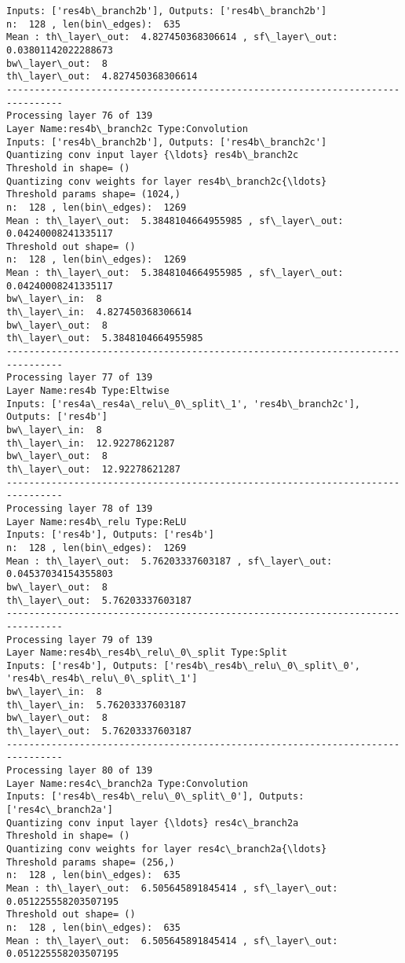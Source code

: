 \documentclass[11pt]{article}
\begin{document}
\begin{Verbatim}[commandchars=\\\{\}]
Inputs: ['res4b\_branch2b'], Outputs: ['res4b\_branch2b']
n:  128 , len(bin\_edges):  635
Mean : th\_layer\_out:  4.827450368306614 , sf\_layer\_out:  0.03801142022288673
bw\_layer\_out:  8
th\_layer\_out:  4.827450368306614
--------------------------------------------------------------------------------
Processing layer 76 of 139
Layer Name:res4b\_branch2c Type:Convolution
Inputs: ['res4b\_branch2b'], Outputs: ['res4b\_branch2c']
Quantizing conv input layer {\ldots} res4b\_branch2c
Threshold in shape= ()
Quantizing conv weights for layer res4b\_branch2c{\ldots}
Threshold params shape= (1024,)
n:  128 , len(bin\_edges):  1269
Mean : th\_layer\_out:  5.3848104664955985 , sf\_layer\_out:  0.04240008241335117
Threshold out shape= ()
n:  128 , len(bin\_edges):  1269
Mean : th\_layer\_out:  5.3848104664955985 , sf\_layer\_out:  0.04240008241335117
bw\_layer\_in:  8
th\_layer\_in:  4.827450368306614
bw\_layer\_out:  8
th\_layer\_out:  5.3848104664955985
--------------------------------------------------------------------------------
Processing layer 77 of 139
Layer Name:res4b Type:Eltwise
Inputs: ['res4a\_res4a\_relu\_0\_split\_1', 'res4b\_branch2c'], Outputs: ['res4b']
bw\_layer\_in:  8
th\_layer\_in:  12.92278621287
bw\_layer\_out:  8
th\_layer\_out:  12.92278621287
--------------------------------------------------------------------------------
Processing layer 78 of 139
Layer Name:res4b\_relu Type:ReLU
Inputs: ['res4b'], Outputs: ['res4b']
n:  128 , len(bin\_edges):  1269
Mean : th\_layer\_out:  5.76203337603187 , sf\_layer\_out:  0.04537034154355803
bw\_layer\_out:  8
th\_layer\_out:  5.76203337603187
--------------------------------------------------------------------------------
Processing layer 79 of 139
Layer Name:res4b\_res4b\_relu\_0\_split Type:Split
Inputs: ['res4b'], Outputs: ['res4b\_res4b\_relu\_0\_split\_0', 'res4b\_res4b\_relu\_0\_split\_1']
bw\_layer\_in:  8
th\_layer\_in:  5.76203337603187
bw\_layer\_out:  8
th\_layer\_out:  5.76203337603187
--------------------------------------------------------------------------------
Processing layer 80 of 139
Layer Name:res4c\_branch2a Type:Convolution
Inputs: ['res4b\_res4b\_relu\_0\_split\_0'], Outputs: ['res4c\_branch2a']
Quantizing conv input layer {\ldots} res4c\_branch2a
Threshold in shape= ()
Quantizing conv weights for layer res4c\_branch2a{\ldots}
Threshold params shape= (256,)
n:  128 , len(bin\_edges):  635
Mean : th\_layer\_out:  6.505645891845414 , sf\_layer\_out:  0.051225558203507195
Threshold out shape= ()
n:  128 , len(bin\_edges):  635
Mean : th\_layer\_out:  6.505645891845414 , sf\_layer\_out:  0.051225558203507195

\end{Verbatim}
\end{document}
